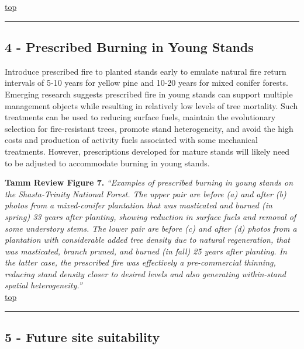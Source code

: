 \documentclass[]{article}
\begin{document}
\protect\hyperlink{top}{top}

\begin{center}\rule{0.5\linewidth}{\linethickness}\end{center}

\hypertarget{Link4}{\subsection{4 - Prescribed Burning in Young
Stands}\label{Link4}}

Introduce prescribed fire to planted stands early to emulate natural
fire return intervals of 5-10 years for yellow pine and 10-20 years for
mixed conifer forests. Emerging research suggests prescribed fire in
young stands can support multiple management objects while resulting in
relatively low levels of tree mortality. Such treatments can be used to
reducing surface fuels, maintain the evolutionary selection for
fire-resistant trees, promote stand heterogeneity, and avoid the high
costs and production of activity fuels associated with some mechanical
treatments. However, prescriptions developed for mature stands will
likely need to be adjusted to accommodate burning in young stands.

 \textbf{Tamm Review Figure 7.} \emph{``Examples of prescribed burning
in young stands on the Shasta-Trinity National Forest. The upper pair
are before (a) and after (b) photos from a mixed-conifer plantation that
was masticated and burned (in spring) 33 years after planting, showing
reduction in surface fuels and removal of some understory stems. The
lower pair are before (c) and after (d) photos from a plantation with
considerable added tree density due to natural regeneration, that was
masticated, branch pruned, and burned (in fall) 25 years after planting.
In the latter case, the prescribed fire was effectively a pre-commercial
thinning, reducing stand density closer to desired levels and also
generating within-stand spatial heterogeneity.''}\\

\protect\hyperlink{top}{top}

\begin{center}\rule{0.5\linewidth}{\linethickness}\end{center}

\hypertarget{Link5}{\subsection{5 - Future site
suitability}\label{Link5}}
\end{document}
